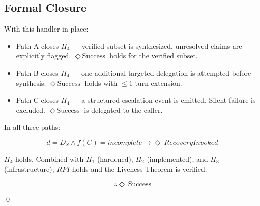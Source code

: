 \subsection*{Formal Closure}

With this handler in place:

\begin{itemize}
  \item Path A closes $\Pi_4$ — verified subset is synthesized, unresolved claims
        are explicitly flagged. $\Diamond\ \text{Success}$ holds for the verified subset.
  \item Path B closes $\Pi_4$ — one additional targeted delegation is attempted
        before synthesis. $\Diamond\ \text{Success}$ holds with $\leq 1$ turn extension.
  \item Path C closes $\Pi_4$ — a structured escalation event is emitted.
        Silent failure is excluded. $\Diamond\ \text{Success}$ is delegated to the caller.
\end{itemize}

In all three paths:

\[ d = D_S \wedge f(C) = incomplete \rightarrow \Diamond\ RecoveryInvoked \]

$\Pi_4$ holds. Combined with $\Pi_1$ (hardened), $\Pi_2$ (implemented),
and $\Pi_3$ (infrastructure), $RPI$ holds and the Liveness Theorem is verified.

\[ \therefore \Diamond\ \text{Success} \]

\qed